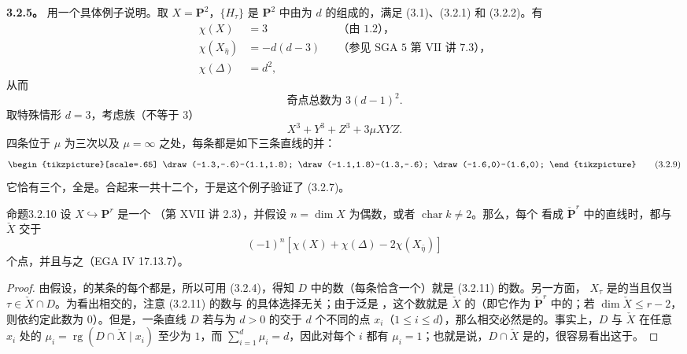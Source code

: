 \textbf{3.2.5。} 用一个具体例子说明。取 $X=\mathbf P^2$，$\{H_\tau\}$ 是 $\mathbf P^2$ 中由为 $d$ 的组成的，满足 (3.1)、(3.2.1) 和 (3.2.2)。有
\[
\begin{aligned}
\chi(X)&=3&&\text{（由 1.2），}\\
\chi(X_{\bar\eta})&=-d(d-3)&&\text{（参见 SGA 5 第 VII 讲 7.3），}\\
\chi(\Delta)&=d^2,
\end{aligned}\tag{3.2.6}
\]
从而
\[
 \text{奇点总数为 }3(d-1)^2.\tag{3.2.7}
\]
取特殊情形 $d=3$，考虑族（不等于 $3$）
\[
 X^3+Y^3+Z^3+3\mu XYZ.\tag{3.2.8}
\]
四条位于 $\mu$ 为三次以及 $\mu=\infty$ 之处，每条都是如下三条直线的并：
\[
\begin{tikzpicture}[scale=.65]
\draw (-1.3,-.6)--(1.1,1.8);
\draw (-1.1,1.8)--(1.3,-.6);
\draw (-1.6,0)--(1.6,0);
\end{tikzpicture}\tag{3.2.9}
\]
它恰有三个，全是。合起来一共十二个，于是这个例子验证了 (3.2.7)。

\begin{SGAresult}{命题}{3.2.10}
设 $X\hookrightarrow\mathbf P^r$ 是一个 （第 XVII 讲 2.3），并假设 $n=\dim X$ 为偶数，或者 $\operatorname{char}k\ne2$。那么，每个 看成 $\check{\mathbf P}^r$ 中的直线时，都与 $\check X$ 交于
\[
 (-1)^n[\chi(X)+\chi(\Delta)-2\chi(X_{\bar\eta})]\tag{3.2.11}
\]
个点，并且与之（EGA IV 17.13.7）。
\end{SGAresult}
\begin{proof}
由假设，的某条的每个都是，所以可用 (3.2.4)，得知 $D$ 中的数（每条恰含一个）就是 (3.2.11) 的数。另一方面， $X_\tau$ 是的当且仅当 $\tau\in\check X\cap D$。为看出相交的，注意 (3.2.11) 的数与 的具体选择无关；由于泛是 ，这个数就是 $\check X$ 的（即它作为 $\check{\mathbf P}^r$ 中的；若 $\dim\check X\leq r-2$，则依约定此数为 $0$）。但是，一条直线 $D$ 若与为 $d>0$ 的交于 $d$ 个不同的点 $x_i$（$1\leq i\leq d$），那么相交必然是的。事实上，$D$ 与 $\check X$ 在任意 $x_i$ 处的 $\mu_i=\operatorname{rg}(D\cap\check X\mid x_i)$ 至少为 $1$，而 $\sum_{i=1}^d\mu_i=d$，因此对每个 $i$ 都有 $\mu_i=1$；也就是说，$D\cap\check X$ 是的，很容易看出这于。
\end{proof}

